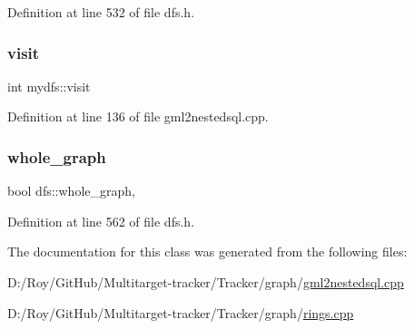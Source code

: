 Definition at line 532 of file dfs.\+h.

\mbox{\label{classmydfs_a6d8114b5e013781c2aee9729bbec09d6}} 
\subsubsection{\texorpdfstring{visit}{visit}}
{\footnotesize\ttfamily int mydfs\+::visit\hspace{0.3cm}{\ttfamily [protected]}}



Definition at line 136 of file gml2nestedsql.\+cpp.

\mbox{\label{classdfs_ab8342c80ab208ef0e0d781f0769d0d95}} 
\subsubsection{\texorpdfstring{whole\+\_\+graph}{whole\_graph}}
{\footnotesize\ttfamily bool dfs\+::whole\+\_\+graph\hspace{0.3cm}{\ttfamily [protected]}, {\ttfamily [inherited]}}



Definition at line 562 of file dfs.\+h.



The documentation for this class was generated from the following files\+:\begin{DoxyCompactItemize}
\item 
D\+:/\+Roy/\+Git\+Hub/\+Multitarget-\/tracker/\+Tracker/graph/\mbox{\hyperlink{gml2nestedsql_8cpp}{gml2nestedsql.\+cpp}}\item 
D\+:/\+Roy/\+Git\+Hub/\+Multitarget-\/tracker/\+Tracker/graph/\mbox{\hyperlink{rings_8cpp}{rings.\+cpp}}\end{DoxyCompactItemize}
